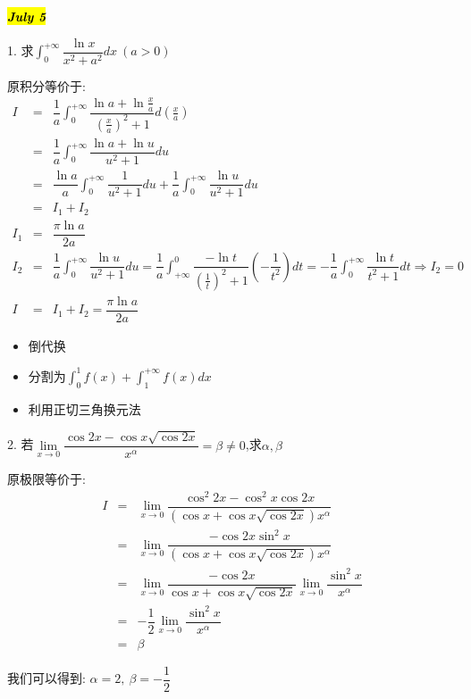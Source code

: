 \hl{\textbf{\textit{July 5}}}

1. 求$\int_{0}^{+\infty}\dfrac{\ln x}{x^2+a^2}dx\ (a>0)$
\begin{solution}
	
	原积分等价于: 
	\begin{eqnarray*}
		I&=&\dfrac{1}{a}\int_{0}^{+\infty}\dfrac{\ln a+\ln \frac{x}{a}}{(\frac{x}{a})^2+1}d(\frac{x}{a})\\
		&=&\dfrac{1}{a}\int_{0}^{+\infty}\dfrac{\ln a+\ln u}{u^2+1}du\\
		&=&\dfrac{\ln a}{a}\int_{0}^{+\infty}\dfrac{1}{u^2+1}du+\dfrac{1}{a}\int_{0}^{+\infty}\dfrac{\ln u}{u^2+1}du\\
		&=&I_{1}+I_{2}\\
		I_{1}&=&\dfrac{\pi \ln a}{2a}\\
		I_{2}&=&\dfrac{1}{a}\int_{0}^{+\infty}\dfrac{\ln u}{u^2+1}du=\dfrac{1}{a}\int_{+\infty}^{0}\dfrac{-\ln t }{(\frac{1}{t})^2+1}(-\dfrac{1}{t^2})dt=-\dfrac{1}{a}\int_{0}^{+\infty}\dfrac{\ln t}{t^2+1}dt\Rightarrow I_{2}=0\\
		I&=&I_{1}+I_{2}=\dfrac{\pi \ln a}{2a}
	\end{eqnarray*}
\end{solution}
\begin{anymark}
	\begin{itemize}
		\item 倒代换
		\item 分割为$\int_{0}^{1}f(x)+\int_{1}^{+\infty}f(x)dx$
		\item 利用正切三角换元法
	\end{itemize}
\end{anymark}

2. 若$\lim\limits_{x\rightarrow 0}\dfrac{\cos 2x-\cos x\sqrt{\cos 2x}}{x^{\alpha}}=\beta\neq0$,求$\alpha,\beta$
\begin{solution}
	
	原极限等价于: 
	\begin{eqnarray*}
		I&=&\lim\limits_{x\rightarrow 0}\dfrac{\cos^2 2x-\cos^2 x\cos 2x}{(\cos x+\cos x\sqrt{\cos 2x})x^{\alpha}}\\
		&=&\lim\limits_{x\rightarrow 0}\dfrac{-\cos2x\sin^2 x}{(\cos x+\cos x\sqrt{\cos 2x})x^{\alpha}}\\
		&=&\lim\limits_{x\rightarrow 0}\dfrac{-\cos 2x}{\cos x+\cos x\sqrt{\cos 2x}}\lim\limits_{x\rightarrow 0}\dfrac{\sin^2 x}{x^{\alpha}}\\
		&=&-\dfrac{1}{2}\lim\limits_{x\rightarrow 0}\dfrac{\sin^2 x}{x^{\alpha}}\\
		&=&\beta
	\end{eqnarray*}
	
	我们可以得到: $\alpha=2,\ \beta=-\dfrac{1}{2}$
\end{solution}

